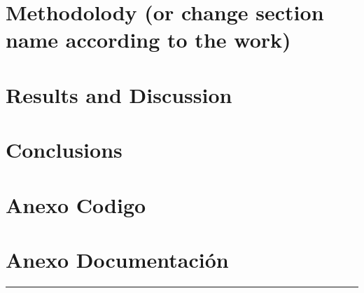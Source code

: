 \documentclass[10pt,a4paper]{article}
\theoremstyle{definition}
\begin{document}
\section{Methodolody (or change section name according to the work)}

\section{Results and Discussion}

\section{Conclusions}

\section{Anexo Codigo}
\section{Anexo Documentación}



\vspace{20pt}
\hrule
\vspace{10pt}

\nocite{*}
%



\end{document}

